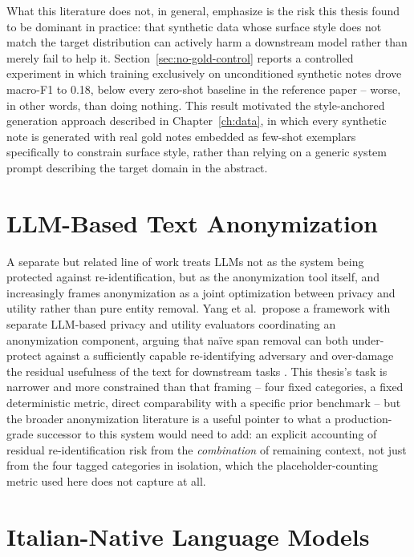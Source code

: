 \documentclass[12pt,a4paper]{report}
\begin{document}
What this literature does not, in general, emphasize is the risk this thesis found to be dominant in practice: that synthetic data whose surface style does not match the target distribution can actively harm a downstream model rather than merely fail to help it. Section~\ref{sec:no-gold-control} reports a controlled experiment in which training exclusively on unconditioned synthetic notes drove macro-F1 to 0.18, below every zero-shot baseline in the reference paper -- worse, in other words, than doing nothing. This result motivated the style-anchored generation approach described in Chapter~\ref{ch:data}, in which every synthetic note is generated with real gold notes embedded as few-shot exemplars specifically to constrain surface style, rather than relying on a generic system prompt describing the target domain in the abstract.

\section{LLM-Based Text Anonymization}

A separate but related line of work treats LLMs not as the system being protected against re-identification, but as the anonymization tool itself, and increasingly frames anonymization as a joint optimization between privacy and utility rather than pure entity removal. Yang et al.\ propose a framework with separate LLM-based privacy and utility evaluators coordinating an anonymization component, arguing that na\"ive span removal can both under-protect against a sufficiently capable re-identifying adversary and over-damage the residual usefulness of the text for downstream tasks \citep{yang2025rupta}. This thesis's task is narrower and more constrained than that framing -- four fixed categories, a fixed deterministic metric, direct comparability with a specific prior benchmark -- but the broader anonymization literature is a useful pointer to what a production-grade successor to this system would need to add: an explicit accounting of residual re-identification risk from the \emph{combination} of remaining context, not just from the four tagged categories in isolation, which the placeholder-counting metric used here does not capture at all.

\section{Italian-Native Language Models}
\end{document}
